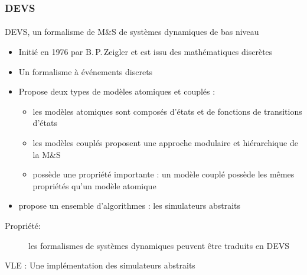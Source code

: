 \documentclass[xetex, compress, table, svgnames]{beamer}
\begin{document}
\begin{frame}
  \frametitle{DEVS}
  \framesubtitle{}
  \begin{exampleblock}{DEVS, un formalisme de M\&S de systèmes
      dynamiques de bas niveau}
    \begin{itemize}
    \item Initié en 1976 par B.\,P.\,Zeigler et est issu des
      \alert{mathématiques discrètes}
    \item Un formalisme à \alert{événements discrets}
    \item Propose deux types de modèles \alert{atomiques} et
      \alert{couplés} :
      \begin{itemize}
      \item les modèles atomiques sont composés d'\alert{états}
        et de fonctions de \alert{transitions} d'états
      \item les modèles couplés proposent une approche
        \alert{modulaire} et \alert{hiérarchique} de la M\&S
      \item possède une propriété importante : un modèle couplé
        possède les mêmes propriétés qu'un modèle atomique
      \end{itemize}
    \item propose un \alert{ensemble d'algorithmes} : les
      simulateurs abstraits
    \end{itemize}
    \pause
    \begin{description}
      \item[Propriété:] les formalismes de systèmes dynamiques
        peuvent être traduits en DEVS
    \end{description}
  \end{exampleblock}
  \pause
  \begin{alertblock}{}
    VLE : Une implémentation des simulateurs abstraits
  \end{alertblock}
\end{frame}
\end{document}
